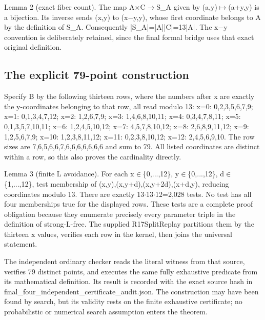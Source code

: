 \documentclass[11pt,a4paper]{article}
\begin{document}
Lemma 2 (exact fiber count). The map A\ensuremath{\times}C\ensuremath{\to}S\_A given by (a,y)\ensuremath{\mapsto}(a+y,y) is a bijection. Its inverse sends (x,y) to (x\ensuremath{-}y,y), whose first coordinate belongs to A by the definition of S\_A. Consequently |S\_A|=|A||C|=13|A|. The x\ensuremath{-}y convention is deliberately retained, since the final formal bridge uses that exact original definition.

\subsection{The explicit 79-point construction}
Specify B by the following thirteen rows, where the numbers after x are exactly the y-coordinates belonging to that row, all read modulo 13: x=0: 0,2,3,5,6,7,9; x=1: 0,1,3,4,7,12; x=2: 1,2,6,7,9; x=3: 1,4,6,8,10,11; x=4: 0,3,4,7,8,11; x=5: 0,1,3,5,7,10,11; x=6: 1,2,4,5,10,12; x=7: 4,5,7,8,10,12; x=8: 2,6,8,9,11,12; x=9: 1,2,5,6,7,9; x=10: 1,2,3,8,11,12; x=11: 0,2,3,8,10,12; x=12: 2,4,5,6,9,10. The row sizes are 7,6,5,6,6,7,6,6,6,6,6,6,6 and sum to 79. All listed coordinates are distinct within a row, so this also proves the cardinality directly.

Lemma 3 (finite L avoidance). For each x\ensuremath{\in}\{0,...,12\}, y\ensuremath{\in}\{0,...,12\}, d\ensuremath{\in}\{1,...,12\}, test membership of (x,y),(x,y+d),(x,y+2d),(x+d,y), reducing coordinates modulo 13. There are exactly 13\ensuremath{\cdot}13\ensuremath{\cdot}12=2,028 tests. No test has all four memberships true for the displayed rows. These tests are a complete proof obligation because they enumerate precisely every parameter triple in the definition of strong-L-free. The supplied R17SplitReplay partitions them by the thirteen x values, verifies each row in the kernel, then joins the universal statement.

The independent ordinary checker reads the literal witness from that source, verifies 79 distinct points, and executes the same fully exhaustive predicate from its mathematical definition. Its result is recorded with the exact source hash in final\_four\_independent\_certificate\_audit.json. The construction may have been found by search, but its validity rests on the finite exhaustive certificate; no probabilistic or numerical search assumption enters the theorem.
\end{document}
